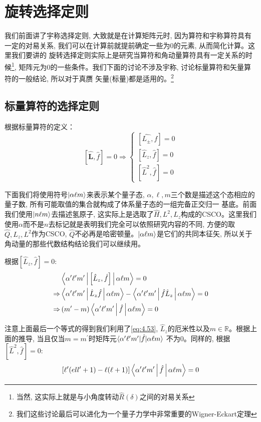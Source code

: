 \section{旋转选择定则}
我们前面讲了宇称选择定则, 大致就是在计算矩阵元时, 因为算符和宇称算符具有一定的对易关系, 我们可以在计算前就提前确定一些为0的元素, 从而简化计算。这里我们要讲的
旋转选择定则实际上是研究当算符和角动量算符具有一定关系的时候\footnote{当然, 这实际上就是与小角度转动$\hat{R}(\delta)$之间的对易关系}, 矩阵元为0的一些条件。我们下面的讨论不涉及宇称, 讨论标量算符和矢量算符的一般结论, 所以对于真赝
矢量(标量)都是适用的。\footnote{我们这些讨论最后可以进化为一个量子力学中非常重要的Wigner-Eckart定理}
\subsection{标量算符的选择定则}
根据标量算符的定义：
\begin{equation}
    \left[\hat{\mathbf{L}},\hat{f}\right]=0\Rightarrow\begin{cases}
        \left[\hat{L_\pm},\hat{f}\right]=0\\
        \left[\hat{L}_z,\hat{f}\right]=0\\
        \left[\hat{L}^2,\hat{f}\right]=0
    \end{cases}
\end{equation}

下面我们将使用符号$\ket{\alpha\ell m}$来表示某个量子态, $\alpha,\ell,m$三个数是描述这个态相应的量子数, 所有可能取值的集合就构成了体系量子态的一组完备正交归一
基底。前面我们使用$\ket{n\ell m}$去描述氢原子, 这实际上是选取了$\hat{H},L^2,L_z$构成的CSCO。这里我们使用$\alpha $而不是$n$去标记就是表明我们完全可以依照研究内容的不同, 方便的取
$\hat{Q},L_z,L^2$作为CSCO, $\hat{Q}$不必再是哈密顿量。$\ket{\alpha\ell m}$是它们的共同本征矢, 所以关于角动量的那些代数结构结论我们可以继续用。

根据$\left[\hat{L}_z,\hat{f}\right]=0$:
\begin{align*}
    &\Braket{\alpha^\prime   \ell^\prime   m^\prime  |\left[\hat{L}_z,\hat{f}\right]|\alpha \ell m}=0\\
    \Rightarrow&\Braket{\alpha^\prime   \ell^\prime   m^\prime  |\hat{L}_z\hat{f}|\alpha \ell m}-\Braket{\alpha^\prime   \ell^\prime   m^\prime  |\hat{f}\hat{L}_z|\alpha \ell m}=0\\
    \Rightarrow&\left(m^\prime-m\right)\Braket{\alpha^\prime   \ell^\prime   m^\prime  |\hat{f}|\alpha \ell m}=0
\end{align*}

注意上面最后一个等式的得到我们利用了\ref{eq:4.53}, $\hat L_z$的厄米性以及$m\in \mathbb{R}$。根据上面的推导, 当且仅当$m=m^\prime$时矩阵元$\braket{\alpha^\prime   \ell^\prime   m^\prime  |\hat{f}|\alpha \ell m}$
不为0。同样的, 根据$\left[\hat{L}^2,\hat{f}\right]=0$:
\begin{equation}
    \left[\ell^\prime(ell^\prime +1)-\ell(\ell+1)\right]\Braket{\alpha^\prime   \ell^\prime   m^\prime  |\hat{f}|\alpha \ell m}=0
\end{equation}

